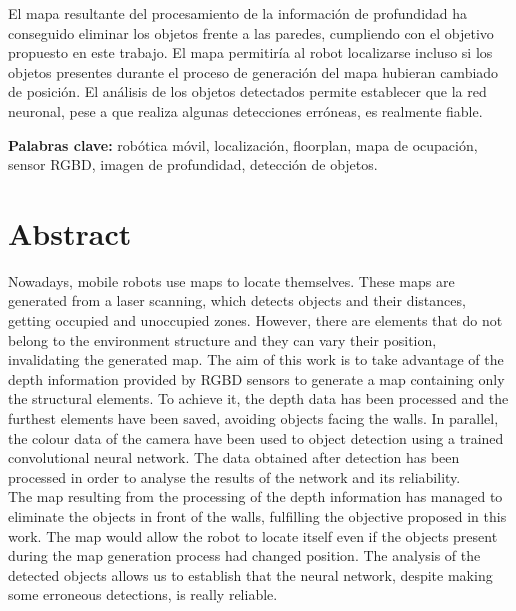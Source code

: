 El mapa resultante del procesamiento de la información de profundidad ha conseguido eliminar los objetos frente a las paredes, cumpliendo con el objetivo propuesto en este trabajo. El mapa permitiría al robot localizarse incluso si los objetos presentes durante el proceso de generación del mapa hubieran cambiado de posición. El análisis de los objetos detectados permite establecer que la red neuronal, pese a que realiza algunas detecciones erróneas, es realmente fiable.\\

\vspace{3cm}

\textbf{Palabras clave:} robótica móvil, localización, floorplan, mapa de ocupación, sensor RGBD, imagen de profundidad, detección de objetos.

\chapter*{Abstract}

Nowadays, mobile robots use maps to locate themselves. These maps are generated from a laser scanning, which detects objects and their distances, getting occupied and unoccupied zones. However, there are elements that do not belong to the environment structure and they can vary their position, invalidating the generated map. The aim of this work is to take advantage of the depth information provided by RGBD sensors to generate a map containing only the structural elements. To achieve it, the depth data has been processed and the furthest elements have been saved, avoiding objects facing the walls. In parallel, the colour data of the camera have been used to object detection using a trained convolutional neural network. The data obtained after detection has been processed in order to analyse the results of the network and its reliability.\\

The map resulting from the processing of the depth information has managed to eliminate the objects in front of the walls, fulfilling the objective proposed in this work. The map would allow the robot to locate itself even if the objects present during the map generation process had changed position. The analysis of the detected objects allows us to establish that the neural network, despite making some erroneous detections, is really reliable.

\vspace{3cm}

